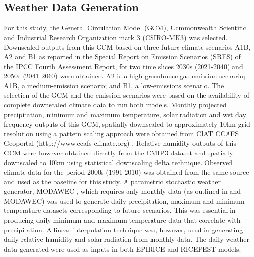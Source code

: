 \documentclass[preprint,12pt]{elsarticle}
\begin{document}
\subsection{Weather Data Generation}
For this study, the General Circulation Model (GCM), Commonwealth Scientific and Industrial Research Organization mark 3 (CSIRO-MK3) was selected. Downscaled outputs from this GCM based on three future climate scenarios A1B, A2 and B1 as reported in the Special Report on Emission Scenarios (SRES) of the IPCC Fourth Assessment Report, for two time slices 2030s (2021-2040) and 2050s (2041-2060) were obtained. A2 is a high greenhouse gas emission scenario; A1B, a medium-emission scenario; and B1, a low-emissions scenario. The selection of the GCM and the emission scenarios were based on the availability of complete downscaled climate data to run both models. Monthly projected precipitation, minimum and maximum temperature, solar radiation and wet day frequency outputs of this GCM, spatially downscaled to approximately 10km grid resolution using a pattern scaling approach were obtained from CIAT CCAFS Geoportal (http://www.ccafs-climate.org) \cite{Jones2009}. Relative humidity outputs of this GCM were however obtained directly from the CMIP3 dataset and spatially downscaled to 10km using statistical downscaling delta technique. Observed climate data for the period 2000s (1991-2010) was obtained from the same source and used as the baseline for this study. A parametric stochastic weather generator, MODAWEC \cite{Liu2009}, which requires only monthly data (as outlined in \citet{Geng1986} and MODAWEC) was used to generate daily precipitation, maximum and minimum temperature datasets corresponding to future scenarios. This was essential in producing daily minimum and maximum temperature data that correlate with precipitation. A linear interpolation technique was, however, used in generating daily relative humidity and solar radiation from monthly data. The daily weather data generated were used as inputs in both EPIRICE and RICEPEST models.
\end{document}

